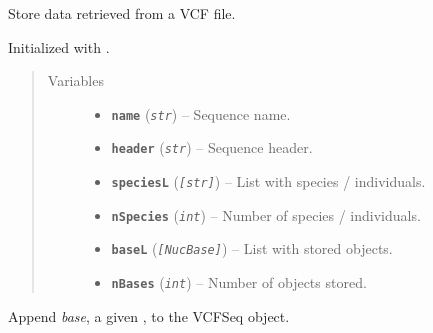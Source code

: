 \documentclass[letterpaper,10pt,english]{sphinxmanual}
\begin{document}
\begin{fulllineitems}
\label{vcf:libPoMo.vcf.VCFSeq}
Store data retrieved from a VCF file.

Initialized with {\hyperref[vcf:libPoMo.vcf.open_seq]{}}.
\begin{quote}\begin{description}
\item[{Variables}] \leavevmode\begin{itemize}
\item {} 
\textbf{\texttt{name}} (\emph{\texttt{str}}) -- Sequence name.

\item {} 
\textbf{\texttt{header}} (\emph{\texttt{str}}) -- Sequence header.

\item {} 
\textbf{\texttt{speciesL}} (\emph{\texttt{{[}str{]}}}) -- List with species / individuals.

\item {} 
\textbf{\texttt{nSpecies}} (\emph{\texttt{int}}) -- Number of species / individuals.

\item {} 
\textbf{\texttt{baseL}} (\emph{\texttt{{[}NucBase{]}}}) -- List with stored {\hyperref[vcf:libPoMo.vcf.NucBase]{}} objects.

\item {} 
\textbf{\texttt{nBases}} (\emph{\texttt{int}}) -- Number of {\hyperref[vcf:libPoMo.vcf.NucBase]{}} objects stored.

\end{itemize}

\end{description}\end{quote}

\begin{fulllineitems}
\label{vcf:libPoMo.vcf.VCFSeq.append_nuc_base}
Append \emph{base}, a given {\hyperref[vcf:libPoMo.vcf.NucBase]{}}, to the VCFSeq object.

\end{fulllineitems}



\end{fulllineitems}
\end{document}

